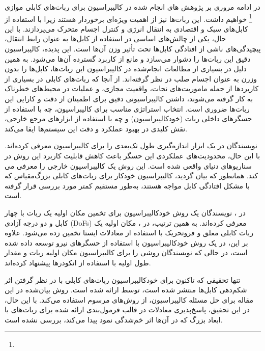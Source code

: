 در ادامه مروری بر پژوهش های انجام شده در کالیبراسیون برای ربات‌های کابلی موازی
  \footnote{}
خواهیم داشت. این ربات‌ها نیز از اهمیت ویژه‌ای برخوردار هستند زیرا با استفاده از کابل‌های سبک و اقتصادی به انتقال انرژی و کنترل اجسام متحرک می‌پردازند. با این حال، یکی از چالش‌های اساسی در استفاده از کابل‌ها به عنوان رابط انتقال، پیچیدگی‌های ناشی از افتادگی کابل‌ها تحت تأثیر وزن آن‌ها است. این پدیده، کالیبراسیون دقیق این ربات‌ها را دشوار می‌سازد و مانع از کاربرد گسترده آن‌ها می‌شود. به همین دلیل در بسیاری از مطالعات انجام‌شده در کالیبراسیون این ربات‌ها، کابل‌ها را بدون وزرن به عنوان اجسام صلب در نظر گرفته‌اند. از آنجا که ربات‌های کابلی در بسیاری از کاربردها از جمله ماموریت‌های نجات، واقعیت مجازی، و عملیات در محیط‌های خطرناک به کار گرفته می‌شوند، داشتن کالیبراسیونی دقیق برای اطمینان از دقت و کارایی این ربات‌ها ضروری است. انتخاب استراتژی مناسب برای کالیبراسیون، چه با استفاده از حسگرهای داخلی ربات (خودکالیبراسیون) و چه با استفاده از ابزارهای مرجع خارجی، نقش کلیدی در بهبود عملکرد و دقت این سیستم‌ها ایفا می‌کند. 
 
نویسندگان در \cite{jin2018geometric} یک ابزار اندازه‌گیری طول تک‌بعدی را برای کالیبراسیون معرفی کرده‌اند. با این حال، محدودیت‌های عملکردی این حسگر باعث کاهش قابلیت کاربرد این روش در سناریوهای دنیای واقعی شده است. این روش یک کالیبراسیون خارجی را معرفی می کند. همانطور که بیان گردید، کالیبراسیون خودکار برای ربات‌های کابلی بزرگ‌مقیاس که با مشکل افتادگی کابل مواجه هستند، به‌طور مستقیم کمتر مورد بررسی قرار گرفته است. 

در \cite{borgstrom2009nims}، نویسندگان یک روش خودکالیبراسیون برای تخمین مکان اولیه یک ربات با چهار کابل و دو درجه آزادی (DoFs) معرفی کرده‌اند. به همین ترتیب، در \cite{ida2019automatic}، مکان اولیه یک ربات کابلی معلق و فروتحریک با استفاده از معادلات ایستا تخمین زده می‌شود. علاوه بر این، در \cite{pott2013cable_ForceSensorCalib} یک روش خودکالیبراسیون با استفاده از حسگرهای نیرو توسعه داده شده است، در حالی که نویسندگان \cite{darvin2018initial} روشی را برای کالیبراسیون مکان اولیه ربات و مقدار طول اولیه با استفاده از انکودرها پیشنهاد کرده‌اند. 
 
تنها تحقیقی که تاکنون برای خودکالیبراسیون ربات‌های کابلی با در نظر گرفتن اثر شکم‌دهی کابل‌ها منتشر شده است، توسط \cite{an2022all} ارائه شده است. روش بیان‌شده در این مقاله برای حل مسئله کالیبراسیون، از روش‌های مرسوم استفاده می‌کند. با این حال، در این تحقیق، پاسخ‌پذیری معادلات در قالب فرمول‌بندی ارائه شده برای ربات‌های با ابعاد بزرگ که در آن‌ها اثر خم‌شدگی نمود پیدا می‌کند، بررسی نشده است.



